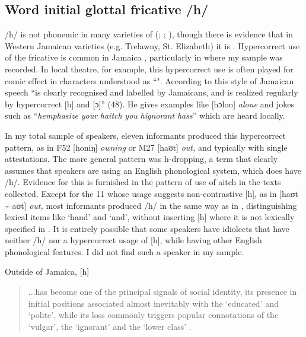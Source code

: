 \subsection{{Word} {initial} {glottal} {fricative} {/h/}}\largerpage%
/h/ is not phonemic in many varieties of  (\citealt[32]{Akers1981}; \citealt[7]{DevonishSeiler1991}; \citealt[40]{Meade2001}), though there is evidence that in Western Jamaican varieties (e.g. Trelawny, St. Elizabeth) it is \citep[12]{Wells1973}.  Hypercorrect use of the fricative is common in Jamaica \citep[lxii]{Cassidy1967}, particularly in  where my sample was recorded.  In local theatre, for example, this hypercorrect use is often played for comic effect in characters understood as ``".  According to \citet{Patrick1997} this style of Jamaican speech “is clearly recognised and labelled by Jamaicans, and is realized regularly by hypercorrect [h] and [ɔ]” (48).  He gives examples like [hɔlon] \textit{alone} and jokes such as “\textit{hemphasize} \textit{your} \textit{haitch} \textit{you} \textit{hignorant} \textit{hass}” which are heard locally.  

  In my total sample of speakers, eleven informants produced this hypercorrect pattern, as in F52 [honiŋ] \textit{owning} or M27 [haʊt] \textit{out,} and typically with single attestations.  The more general pattern was h-dropping, a term that clearly assumes that speakers are using an English phonological system, which does have /h/.  Evidence for this is furnished in the pattern of use of aitch in the texts collected.  Except for the 11 whose usage suggests non-contrastive [h], as in [haʊt {\textasciitilde} aʊt] \textit{out,} most informants produced /h/ in the same way as in , distinguishing lexical items like ‘hand’ and ‘and’, without inserting [h] where it is not lexically specified in .  It is entirely possible that some speakers have idiolects that have neither /h/ nor a hypercorrect usage of [h], while having other English phonological features.  I did not find such a speaker in my sample.\pagebreak

  Outside of Jamaica, [h]

\begin{quote}
	...has become one of the principal signals of social identity, its presence in initial positions associated almost inevitably with the ‘educated’ and ‘polite’, while its loss commonly triggers popular connotations of the ‘vulgar’, the ‘ignorant’ and the ‘lower class’ \citep[107]{Mugglestone1995}. 
\end{quote}

